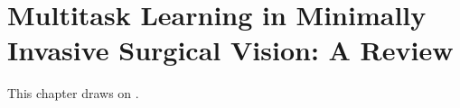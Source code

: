 \chapter{Multitask Learning in Minimally Invasive Surgical Vision: A Review}
\label{chap:background}
\minitoc

This chapter draws on .

\begingroup
\setlength{\emergencystretch}{2em}
\graphicspath{{phd_papers/sources/Multitask_Learning_in_Minimally_Invasive_Surgical_Vision__A_Review_submitted/}}
\providecommand{\bluecline}[1]{\arrayrulecolor{blue}\cline{#1}\arrayrulecolor{black}}
\providecommand{\thickhline}{\Xhline{3.5\arrayrulewidth}}
\providecommand{\miaojing}[1]{\textcolor{green}{[MS: #1]}}
\providecommand{\tom}[1]{\textcolor{blue}{[TV: #1]}}
\providecommand{\tosin}[1]{\textcolor{magenta}{[TA: #1]}}
\providecommand{\figref}[1]{\figurename~\ref{#1}}
\providecommand{\tabref}[1]{\tablename~\ref{#1}}
\providecommand{\secref}[1]{Section~\ref{#1}}

\endgroup
